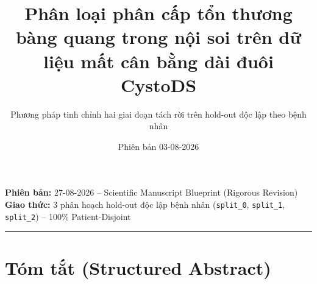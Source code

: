\documentclass[
  10pt,
  a4paper,
  twocolumn]{article}
\title{Phân loại phân cấp tổn thương bàng quang trong nội soi trên dữ
liệu mất cân bằng dài đuôi CystoDS}
\subtitle{Phương pháp tinh chỉnh hai giai đoạn tách rời trên hold-out
độc lập theo bệnh nhân}
\author{}
\date{Phiên bản 03-08-2026}
\begin{document}
\maketitle

\textbf{Phiên bản:} 27-08-2026 -- Scientific Manuscript Blueprint
(Rigorous Revision)\\
\textbf{Giao thức:} 3 phân hoạch hold-out độc lập bệnh nhân
(\texttt{split\_0}, \texttt{split\_1}, \texttt{split\_2}) -- 100\%
Patient-Disjoint

\begin{center}\rule{0.5\linewidth}{0.5pt}\end{center}

\section{Tóm tắt (Structured
Abstract)}\label{tuxf3m-tux1eaft-structured-abstract}
\end{document}
